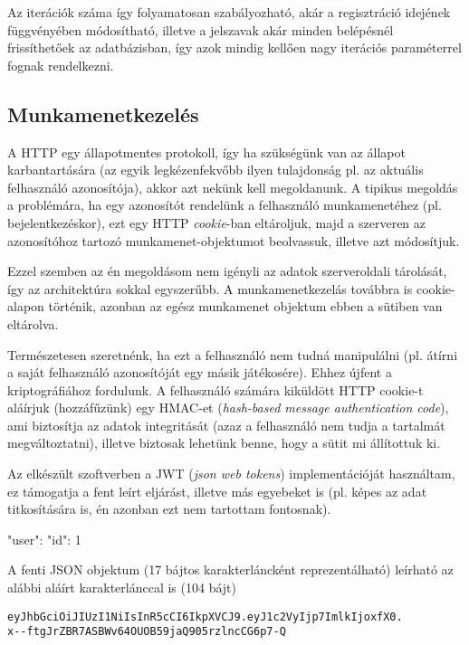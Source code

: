 \begin{itemize}
Az iterációk száma így folyamatosan szabályozható, akár a regisztráció idejének
függvényében módosítható, illetve a jelszavak akár minden belépésnél
frissíthetőek az adatbázisban, így azok mindig kellően nagy iterációs
paraméterrel fognak rendelkezni.

\subsection{Munkamenetkezelés}

A HTTP egy állapotmentes protokoll, így ha szükségünk van az állapot
karbantartására (az egyik legkézenfekvőbb ilyen tulajdonság pl. az aktuális
felhasználó azonosítója), akkor azt nekünk kell megoldanunk. A tipikus megoldás
a problémára, ha egy azonosítót rendelünk a felhasználó munkamenetéhez (pl.
bejelentkezéskor), ezt egy HTTP \emph{cookie}-ban eltároljuk, majd a szerveren
az azonosítóhoz tartozó munkamenet-objektumot beolvassuk, illetve azt
módosítjuk.

Ezzel szemben az én megoldásom nem igényli az adatok szerveroldali tárolását,
így az architektúra sokkal egyszerűbb. A munkamenetkezelás továbbra is
cookie-alapon történik, azonban az egész munkamenet objektum ebben a sütiben
van eltárolva.

Természetesen szeretnénk, ha ezt a felhasználó nem tudná manipulálni (pl. átírni
a saját felhasználó azonosítóját egy másik játékosére). Ehhez újfent a
kriptográfiához fordulunk. A felhasználó számára kiküldött HTTP cookie-t
aláírjuk (hozzáfűzünk) egy HMAC-et (\emph{hash-based message authentication
  code}), ami biztosítja az adatok integritását (azaz a felhasználó nem tudja a
tartalmát megváltoztatni), illetve biztosak lehetünk benne, hogy a sütit mi
állítottuk ki.

Az elkészült szoftverben a JWT (\emph{json web tokens}) implementációját
használtam, ez támogatja a fent leírt eljárást, illetve más egyebeket is (pl.
képes az adat titkosítására is, én azonban ezt nem tartottam fontosnak).

\begin{js}
{
  "user": {
    "id": 1
  }
}
\end{js}

A fenti JSON objektum (17 bájtos karakterláncként reprezentálható) leírható az
alábbi aláírt karakterlánccal is (104 bájt)

\begin{verbatim}
eyJhbGciOiJIUzI1NiIsInR5cCI6IkpXVCJ9.eyJ1c2VyIjp7ImlkIjoxfX0.
x--ftgJrZBR7ASBWv64OUOB59jaQ905rzlncCG6p7-Q
\end{verbatim}


\end{itemize}
